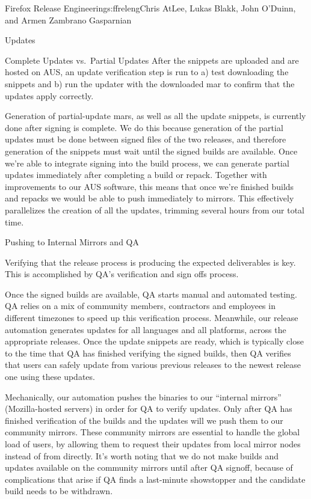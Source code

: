 \begin{aosachapter}{Firefox Release Engineering}{s:ffreleng}{Chris AtLee, Lukas Blakk, John O'Duinn, and Armen Zambrano Gasparnian}
\begin{aosasect1}{Updates}
\begin{aosasect2}{Complete Updates vs.\ Partial Updates}
After the snippets are
uploaded and are hosted on AUS, an update verification step is run to
a) test downloading the snippets and b) run the updater with the
downloaded mar to confirm that the updates apply correctly.

Generation of partial-update mars, as well as all the update snippets,
is currently done after signing is complete. We do this because
generation of the partial updates must be done between signed files of
the two releases, and therefore generation of the snippets must wait
until the signed builds are available.  Once we're able to integrate
signing into the build process, we can generate partial updates
immediately after completing a build or repack. Together with
improvements to our AUS software, this means that once we're finished
builds and repacks we would be able to push immediately to
mirrors. This effectively parallelizes the creation of all the
updates, trimming several hours from our total time.
  
\end{aosasect2}

\end{aosasect1}

\begin{aosasect1}{Pushing to Internal Mirrors and QA}

Verifying that the release process is producing the expected
deliverables is key. This
is accomplished by QA's verification and sign offs process.

Once the signed builds are available, QA starts manual and automated
testing. QA relies on a mix of community members,
contractors and employees in different timezones to speed up this
verification process. Meanwhile, our release automation generates
updates for all languages and all platforms, across the appropriate
releases. Once the update snippets are ready, which is typically close
to the time that QA has finished verifying the signed builds, then QA
verifies that users can safely update from various previous releases
to the newest release one using these updates.

Mechanically, our automation pushes the binaries to our ``internal
mirrors'' (Mozilla-hosted servers) in order for QA to verify
updates. Only after QA has finished verification of the builds and
the updates will we push them to our
community mirrors. These community mirrors are essential to
handle the global load of users, by allowing them to request their updates
from local mirror nodes instead of from 
directly. It's worth noting that we do not make builds and updates
available on the community mirrors until after QA signoff, because of
complications that arise if QA finds a last-minute showstopper
and the candidate build needs to be withdrawn.


\end{aosasect1}
\end{aosachapter}
